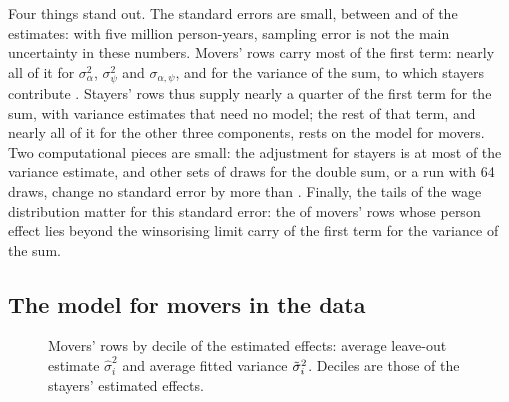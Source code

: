 Four things stand out. The standard errors are small, between  and  of the
estimates: with five million person-years, sampling error is not the main uncertainty in these numbers.
Movers' rows carry most of the first term: nearly all of it for $\sigma^2_\alpha$, $\sigma^2_\psi$ and
$\sigma_{\alpha,\psi}$, and  for the variance of the sum, to which stayers contribute
. Stayers' rows thus supply nearly a quarter of the first term for the sum, with
variance estimates that need no model; the rest of that term, and nearly all of it for the other three
components, rests on the model for movers. Two computational pieces are small: the adjustment for stayers is at
most  of the variance estimate, and other sets of draws for the double sum, or
a run with 64 draws, change no standard error by more than . Finally, the tails of the
wage distribution matter for this standard error: the  of movers' rows whose person effect
lies beyond the winsorising limit carry  of the first term for the variance of the
sum.

\subsection{The model for movers in the data}

\begin{figure}[H]
\centering

\caption{Movers' rows by decile of the estimated effects: average leave-out estimate $\hat\sigma_i^2$ and average
fitted variance $\tilde\sigma_i^2$. Deciles are those of the stayers' estimated effects.}
\label{fig:profile}
\end{figure}


